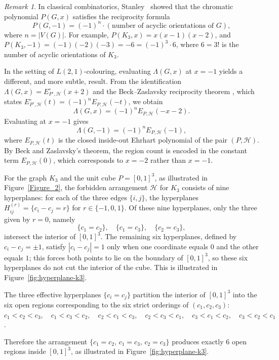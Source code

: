 \documentclass{birkjour}
\theoremstyle{definition}
\theoremstyle{remark}
\newtheorem{remark}[theorem]{Remark}
\numberwithin{equation}{section}
\begin{document}
\begin{remark}
In classical combinatorics, Stanley~\cite{S} showed that the chromatic
polynomial \( P(G,x) \) satisfies the reciprocity formula
\[
P(G,-1) = (-1)^n \cdot (\text{number of acyclic orientations of } G),
\]
where \( n = |V(G)| \). For example, \( P(K_3, x) = x(x-1)(x-2) \),
and \( P(K_3,-1) = (-1)(-2)(-3) = -6 = (-1)^3 \cdot 6 \), where \( 6 = 3! \)
is the number of acyclic orientations of \( K_3 \).
 
In the setting of \( L(2,1) \)-colouring, evaluating \( \Lambda(G,x) \) at
\( x = -1 \) yields a different, and more subtle, result.
From the identification \( \Lambda(G,x) = E^{\circ}_{P^{\circ},\mathcal{H}}(x+2) \)
and the Beck--Zaslavsky reciprocity theorem \cite{BZ}, which states
\( E^{\circ}_{P^{\circ},\mathcal{H}}(t) = (-1)^n E_{P,\mathcal{H}}(-t) \),
we obtain
\[
\Lambda(G,x) = (-1)^n E_{P,\mathcal{H}}(-x-2).
\]
Evaluating at \( x = -1 \) gives
\[
\Lambda(G,-1) = (-1)^n E_{P,\mathcal{H}}(-1),
\]
where \( E_{P,\mathcal{H}}(t) \) is the closed inside-out Ehrhart polynomial
of the pair \( (P,\mathcal{H}) \). By Beck and Zaslavsky's theorem, the region count is encoded
in the constant term \( E_{P,\mathcal{H}}(0) \), which corresponds to
\( x = -2 \) rather than \( x = -1 \).
 
For the graph \( K_3 \) and the unit cube \( P = [0,1]^3 \),
as illustrated in Figure~\ref{Figure_2},
the forbidden arrangement \( \mathcal{H} \) for \( K_3 \) consists of nine
hyperplanes: for each of the three edges \( \{i,j\} \), the hyperplanes
\( H_{ij}^{(r)} = \{c_i - c_j = r\} \) for \( r \in \{-1, 0, 1\} \).
Of these nine hyperplanes, only the three given by \( r = 0 \), namely
\[
\{c_1 = c_2\}, \quad \{c_1 = c_3\}, \quad \{c_2 = c_3\},
\]
intersect the interior of \( [0,1]^3 \). The remaining six hyperplanes,
defined by \( c_i - c_j = \pm 1 \), satisfy \( |c_i - c_j| = 1 \) only
when one coordinate equals \( 0 \) and the other equals \( 1 \); this
forces both points to lie on the boundary of \( [0,1]^3 \), so
these six hyperplanes do not cut the interior of the cube. This is
illustrated in Figure~\ref{fig:hyperplane-k3}.
 
The three effective hyperplanes \( \{c_i = c_j\} \) partition the interior
of \( [0,1]^3 \) into the six open regions corresponding to the six strict
orderings of \( (c_1, c_2, c_3) \): $c_1 < c_2 < c_3, \quad c_1 < c_3 < c_2, \quad c_2 < c_1 < c_3,
\quad c_2 < c_3 < c_1, \quad c_3 < c_1 < c_2, \quad c_3 < c_2 < c_1$.

Therefore the arrangement \( \{c_1 = c_2,\, c_1 = c_3,\, c_2 = c_3\} \)
produces exactly \(6 \) open regions inside \( [0,1]^3 \),
as illustrated in Figure~\ref{fig:hyperplane-k3}.
 

\end{remark}
\end{document}
